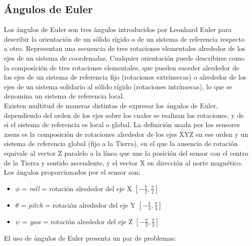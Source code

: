\documentclass[12pt, a4paper]{report}
\begin{document}
\subsection{Ángulos de Euler}

Los ángulos de Euler son tres ángulos introducidos por Leonhard Euler para describir la orientación de un sólido rígido o de un sistema de referencia respecto a otro. Representan una secuencia de tres rotaciones elementales alrededor de los ejes de un sistema de coordenadas. Cualquier orientación puede describirse como la composición de tres rotaciones elementales, que pueden suceder alrededor de los ejes de un sistema de referencia fijo (rotaciones extrínsecas) o alrededor de los ejes de un sistema solidario al sólido rígido (rotaciones intrínsecas), lo que se denomina un sistema de referencia local. \\

Existen multitud de maneras distintas de expresar los ángulos de Euler, dependiendo del orden de los ejes sobre los cuales se realizan las rotaciones, y de si el sistema de referencia es local o global. La definición usada por los sensores xsens es la composición de rotaciones alrededor de los ejes XYZ en ese orden y un sistema de referencia global (fijo a la Tierra), en el que la ausencia de rotación equivale al vector Z paralelo a la línea que une la posición del sensor con el centro de la Tierra y sentido ascendente, y el vector X en dirección al norte magnético. \\

Los ángulos proporcionados por el sensor son:

\begin{itemize}

\item $\phi$ = \textit{roll} = rotación alrededor del eje X $[-\frac{\pi}{2}, \frac{\pi}{2}]$

\item $\theta$ = \textit{pitch} = rotación alrededor del eje Y $[-\frac{\pi}{4}, \frac{\pi}{4}]$

\item $\psi$ = \textit{yaw} = rotación alrededor del eje Z $[-\frac{\pi}{2}, \frac{\pi}{2}]$

\end{itemize}

El uso de ángulos de Euler presenta un par de problemas:
\end{document}
